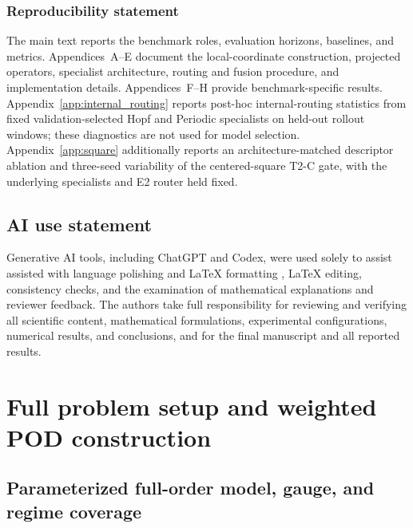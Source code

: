 \documentclass{article}
\providecommand{\DIFaddtex}[1]{{\protect\color{blue} \sf #1}} %
\providecommand{\DIFdeltex}[1]{{\protect\color{red} \scriptsize #1}} %
\providecommand{\DIFaddbegin}{} %
\providecommand{\DIFaddend}{} %
\providecommand{\DIFdelbegin}{} %
\providecommand{\DIFdelend}{} %
\providecommand{\DIFadd}[1]{\texorpdfstring{\DIFaddtex{#1}}{#1}} %
\providecommand{\DIFdel}[1]{\texorpdfstring{\DIFdeltex{#1}}{}} %
\providecommand{\DIFscaledelfig}{0.5}
\newlength{\DIFdelgraphicswidth} %
\newlength{\DIFdelgraphicsheight} %
\providecommand{\DIFaddincludegraphics}[2][]{{\color{blue}\fbox{\DIFOincludegraphics[#1]{#2}}}} %
\providecommand{\DIFdelincludegraphics}[2][]{%
\sbox{\DIFdelgraphicsbox}{\DIFOincludegraphics[#1]{#2}}%
\settoboxwidth{\DIFdelgraphicswidth}{\DIFdelgraphicsbox} %
\settoboxtotalheight{\DIFdelgraphicsheight}{\DIFdelgraphicsbox} %
\scalebox{\DIFscaledelfig}{%
\parbox[b]{\DIFdelgraphicswidth}{\usebox{\DIFdelgraphicsbox}\\[-\baselineskip] \rule{\DIFdelgraphicswidth}{0em}}\llap{\resizebox{\DIFdelgraphicswidth}{\DIFdelgraphicsheight}{%
\setlength{\unitlength}{\DIFdelgraphicswidth}%
\begin{picture}(1,1)%
\thicklines\linethickness{2pt} %
{\color[rgb]{1,0,0}\put(0,0){\framebox(1,1){}}}%
{\color[rgb]{1,0,0}\put(0,0){\line( 1,1){1}}}%
{\color[rgb]{1,0,0}\put(0,1){\line(1,-1){1}}}%
\end{picture}%
}\hspace*{3pt}}} %
} %
\DeclareRobustCommand{\DIFaddbegin}{\DIFOaddbegin \let\includegraphics\DIFaddincludegraphics} %
\DeclareRobustCommand{\DIFaddend}{\DIFOaddend \let\includegraphics\DIFOincludegraphics} %
\DeclareRobustCommand{\DIFdelbegin}{\DIFOdelbegin \let\includegraphics\DIFdelincludegraphics} %
\DeclareRobustCommand{\DIFdelend}{\DIFOaddend \let\includegraphics\DIFOincludegraphics} %
\begin{document}
\subsubsection*{Reproducibility statement}
The main text reports the benchmark roles, evaluation horizons, baselines, and metrics. Appendices~A--E document the local-coordinate construction, projected operators, specialist architecture, routing and fusion procedure, and implementation details. Appendices~F--H provide benchmark-specific results.
Appendix~\ref{app:internal_routing} reports post-hoc internal-routing statistics
from fixed validation-selected Hopf and Periodic specialists on held-out
rollout windows; these diagnostics are not used for model selection.
Appendix~\ref{app:square} additionally reports an architecture-matched descriptor
ablation and three-seed variability of the centered-square T2-C gate, with the
underlying specialists and E2 router held fixed.

\subsection*{AI use statement}
Generative AI tools, including ChatGPT and Codex, \DIFdelbegin \DIFdel{were used solely to assist }\DIFdelend \DIFaddbegin \DIFadd{assisted }\DIFaddend with language polishing\DIFdelbegin \DIFdel{and LaTeX formatting}\DIFdelend \DIFaddbegin \DIFadd{, LaTeX editing, consistency checks, and the examination of mathematical explanations and reviewer feedback}\DIFaddend . The authors take full responsibility for reviewing and verifying all scientific
content, mathematical formulations, experimental configurations, numerical
results, and conclusions, and for the final manuscript and all reported results.

\DIFdelbegin %
\DIFdelend \DIFaddbegin 
\DIFaddend 

\appendix
\section{Full problem setup and weighted POD construction}
\label{app:problem_pod}

\subsection{Parameterized full-order model, gauge, and regime coverage}
\end{document}
